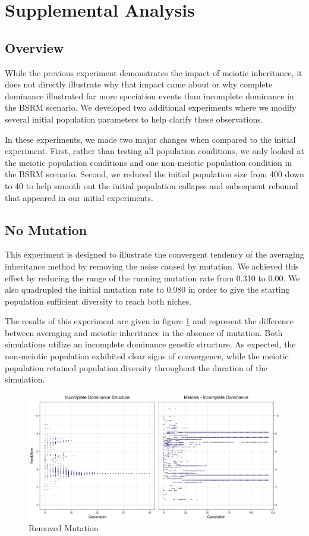 \documentclass{article}
\begin{document}
\section{Supplemental Analysis}

\subsection{Overview}

While the previous experiment demonstrates the impact of meiotic inheritance, it does not directly illustrate why that impact came about or why complete dominance illustrated far more speciation events than incomplete dominance in the BSRM scenario. We developed two additional experiments where we modify several initial population parameters to help clarify these observations. 

In these experiments, we made two major changes when compared to the initial experiment. First, rather than testing all population conditions, we only looked at the meiotic population conditions and one non-meiotic population condition in the BSRM scenario. Second, we reduced the initial population size from 400 down to 40 to help smooth out the initial population collapse and subsequent rebound that appeared in our initial experiments.

\subsection{No Mutation}

This experiment is designed to illustrate the convergent tendency of the averaging inheritance method by removing the noise caused by mutation. We achieved this effect by reducing the range of the running mutation rate from 0.310 to 0.00. We also quadrupled the initial mutation rate to 0.980 in order to give the starting population sufficient diversity to reach both niches. 

The results of this experiment are given in figure \ref{fig:EXP4} and represent the difference between averaging and meiotic inheritance in the absence of mutation. Both simulations utilize an incomplete dominance genetic structure. As expected, the non-meiotic population exhibited clear signs of convergence, while the meiotic population retained population diversity throughout the duration of the simulation. 

\begin{figure}
    \centering
    \includegraphics[width=\linewidth]{Data/EXP4}
    \caption{Removed Mutation}
    \label{fig:EXP4}
\end{figure}
\end{document}
